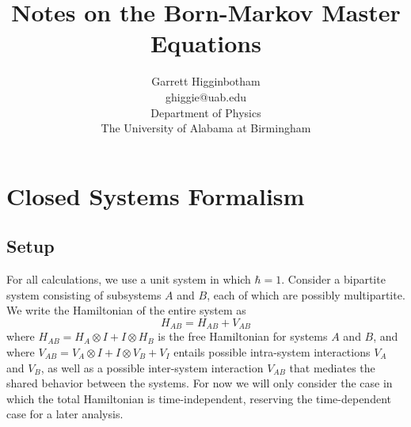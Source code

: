 \documentclass{article}
\newcommand{\ten}{\otimes}
\begin{document}


%
\title{Notes on the Born-Markov Master Equations}
\author{Garrett Higginbotham\\ghiggie@uab.edu\\Department of Physics\\The University of Alabama at Birmingham}

\maketitle
\tableofcontents

\section{Closed Systems Formalism}

\subsection{Setup}

For all calculations, we use a unit system in which $\hbar = 1$. Consider a bipartite system consisting of subsystems $A$ and $B$, each of which are possibly multipartite. We write the Hamiltonian of the entire system as
\begin{equation}\label{ham}
H_{AB} = H_{AB} + V_{AB}
\end{equation}
where $H_{AB} =  H_A\ten I + I\ten H_B$ is the free Hamiltonian for systems $A$ and $B$, and where $V_{AB} = V_A\ten I + I\ten V_B + V_I$ entails possible intra-system interactions $V_A$ and $V_B$, as well as a possible inter-system interaction $V_{AB}$ that mediates the shared behavior between the systems. For now we will only consider the case in which the total Hamiltonian is time-independent, reserving the time-dependent case for a later analysis.
\end{document}
